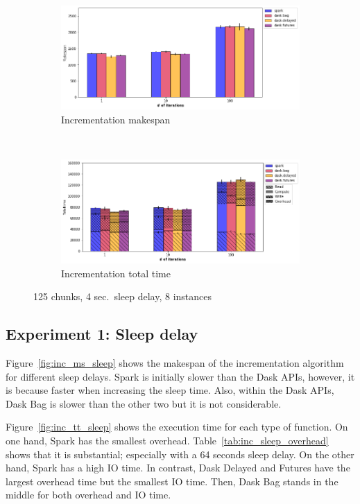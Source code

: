 \documentclass[conference]{IEEEtran}
\begin{document}
\begin{figure}[!t]
    \centering
    \begin{subfigure}[b]{\columnwidth}
        \includegraphics[clip,width=\columnwidth]{images/inc_itr.png}%
        \caption{Incrementation makespan}\label{fig:inc_ms_itr}
    \end{subfigure}
    \\
    \begin{subfigure}[b]{\columnwidth}
        \includegraphics[clip,width=\columnwidth]{images/inc_idle_itr.png}%
        \caption{Incrementation total time}\label{fig:inc_tt_itr}
    \end{subfigure}
    \caption{125 chunks, 4 sec.\ sleep delay, 8 instances}
\end{figure}


\subsection{Experiment 1: Sleep delay}
Figure~\ref{fig:inc_ms_sleep} shows the makespan of the incrementation algorithm for
different sleep delays. Spark is initially slower than the Dask APIs, however, it is
because faster when increasing the sleep time. Also, within the Dask APIs, Dask Bag
is slower than the other two but it is not considerable.

Figure~\ref{fig:inc_tt_sleep} shows the execution time for each type of function. On
one hand, Spark has the smallest overhead. Table~\ref{tab:inc_sleep_overhead} shows
that it is substantial; especially with a 64 seconds sleep delay. On the other hand,
Spark has a high IO time. In contrast, Dask Delayed and Futures have the largest
overhead time but the smallest IO time. Then, Dask Bag stands in the middle for both
overhead and IO time.
\end{document}
